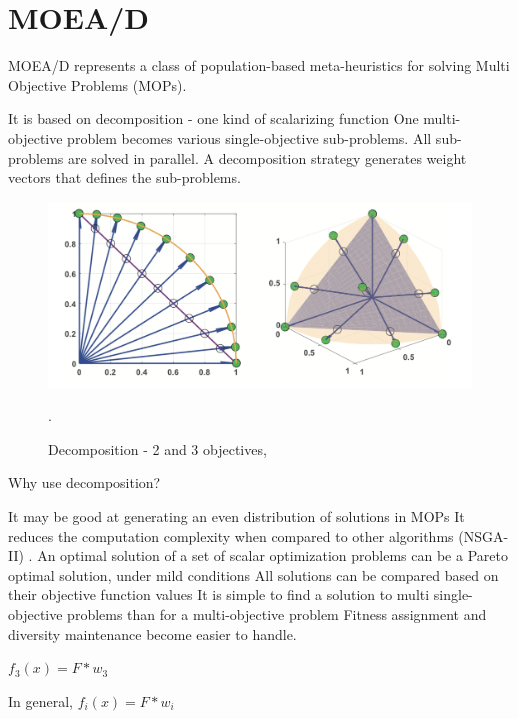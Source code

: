 
\section{MOEA/D}\label{sec:background} 


MOEA/D represents a class of population-based meta-heuristics for solving Multi Objective Problems (MOPs).

It is based on decomposition - one kind of scalarizing function
One multi-objective problem becomes various single-objective sub-problems.
All sub-problems are solved in parallel.
A decomposition strategy generates weight vectors that defines the sub-problems.

\begin{figure}[!t]
	\centering
	\includegraphics[width=\textwidth]{images/decomp2.png}
	\caption{Decomposition  -  2 and 3 objectives, \cite{chugh2017handling} }.
\end{figure}

Why use decomposition?

It may be good at generating an even distribution of solutions in MOPs
It reduces the computation complexity when compared to other algorithms (NSGA-II) \cite{zhang2009performance}.
An optimal solution of a set of scalar optimization problems can be a Pareto optimal solution, under mild conditions
All solutions can be compared based on their objective function values
It is simple to find a solution to multi single-objective problems than for a multi-objective problem
Fitness assignment and diversity maintenance become easier to handle.

$f_{3}(x) = F * w_{3}$

In general, $f_{i}(x) = F * w_{i}$

